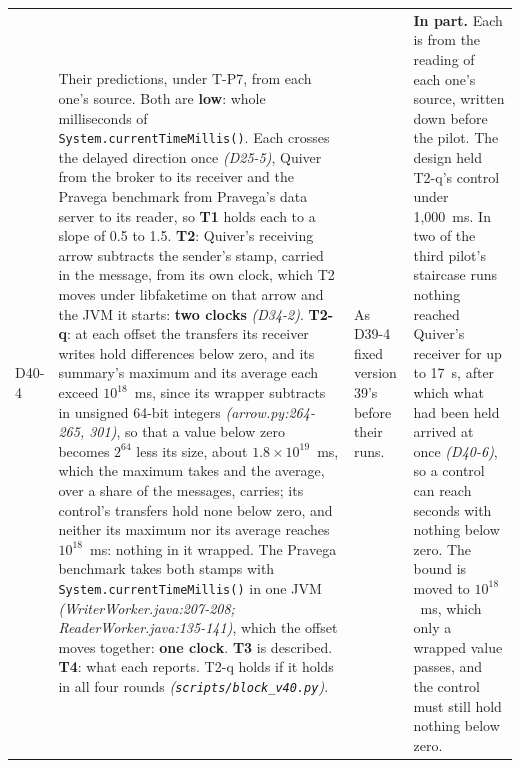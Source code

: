 \documentclass[11pt]{article}
\newcommand{\gl}[1]{{\color{soft}\itshape\small (#1)}}
\begin{document}
{\begin{longtable}{@{}p{1.1cm} >{\raggedright\arraybackslash}p{6.1cm} >{\raggedright\arraybackslash}p{6.0cm} >{\raggedright\arraybackslash}p{2.2cm}@{}}
D40-4 & Their predictions, under T-P7, from each one's source. Both are \textbf{low}: whole milliseconds of \texttt{System.currentTimeMillis()}. Each crosses the delayed direction once \gl{D25-5}, Quiver from the broker to its receiver and the Pravega benchmark from Pravega's data server to its reader, so \textbf{T1} holds each to a slope of 0.5 to 1.5. \textbf{T2}: Quiver's receiving arrow subtracts the sender's stamp, carried in the message, from its own clock, which T2 moves under libfaketime on that arrow and the JVM it starts: \textbf{two clocks} \gl{D34-2}. \textbf{T2-q}: at each offset the transfers its receiver writes hold differences below zero, and its summary's maximum and its average each exceed $10^{18}$~ms, since its wrapper subtracts in unsigned 64-bit integers \gl{arrow.py:264-265, 301}, so that a value below zero becomes $2^{64}$ less its size, about $1.8\times10^{19}$~ms, which the maximum takes and the average, over a share of the messages, carries; its control's transfers hold none below zero, and neither its maximum nor its average reaches $10^{18}$~ms: nothing in it wrapped. The Pravega benchmark takes both stamps with \texttt{System.currentTimeMillis()} in one JVM \gl{WriterWorker.java:207-208; ReaderWorker.java:135-141}, which the offset moves together: \textbf{one clock}. \textbf{T3} is described. \textbf{T4}: what each reports. T2-q holds if it holds in all four rounds \gl{\texttt{scripts/block\_v40.py}}. & As D39-4 fixed version 39's before their runs. & \textbf{In part.} Each is from the reading of each one's source, written down before the pilot. The design held T2-q's control under 1,000~ms. In two of the third pilot's staircase runs nothing reached Quiver's receiver for up to 17~s, after which what had been held arrived at once \gl{D40-6}, so a control can reach seconds with nothing below zero. The bound is moved to $10^{18}$~ms, which only a wrapped value passes, and the control must still hold nothing below zero. \\

\end{longtable}}
\end{document}

